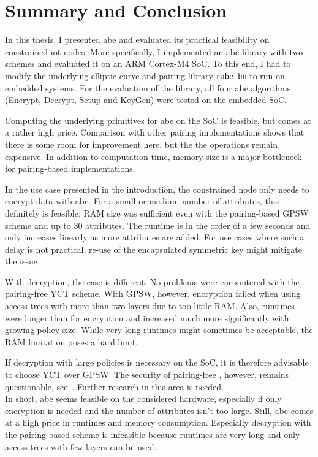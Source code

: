 \chapter{Summary and Conclusion}

In this thesis, I presented \acrshort{abe} and evaluated its practical feasibility on constrained \acrshort{iot} nodes.
More specifically, I implemented an \acrfull{abe} library with two schemes and evaluated it on an ARM Cortex-M4 SoC.
To this end, I had to modify the underlying elliptic curve and pairing library \texttt{rabe-bn} to run on embedded systems.
For the evaluation of the library, all four \acrshort{abe} algorithms (Encrypt, Decrypt, Setup and KeyGen) were tested on the embedded SoC.

Computing the underlying primitives for \acrshort{abe} on the SoC is feasible, but comes at a rather high price.
Comparison with other pairing implementations shows that there is some room for improvement here, but the the operations remain expensive.
In addition to computation time, memory size is a major bottleneck for pairing-based implementations.

In the use case presented in the introduction, the constrained node only needs to encrypt data with \acrshort{abe}.
For a small or medium number of attributes, this definitely is feasible:
RAM size was sufficient even with the pairing-based GPSW scheme and up to 30 attributes.
The runtime is in the order of a few seconds and only increases linearly as more attributes are added.
For use cases where such a delay is not practical, re-use of the encapsulated symmetric key might mitigate the issue.

With decryption, the case is different: 
No problems were encountered with the pairing-free YCT scheme.
With GPSW, however, encryption failed when using \glspl{access-tree} with more than two layers due to too little RAM.
Also, runtimes were longer than for encryption and increased much more significantly with growing policy size.
While very long runtimes might sometimes be acceptable, the RAM limitation poses a hard limit.

If decryption with large policies is necessary on the SoC, it is therefore advisable to choose YCT over GPSW.
The security of pairing-free , however, remains questionable, see~\cite{herranz_attacking_2020}.
Further research in this area is needed.\\

In short, \acrfull{abe} seems feasible on the considered hardware, especially if only encryption is needed and the number of attributes isn't too large.
Still, \acrshort{abe} comes at a high price in runtimes and memory consumption.
Especially decryption with the pairing-based scheme is infeasible because runtimes are very long and only \glspl{access-tree} with few layers can be used.

